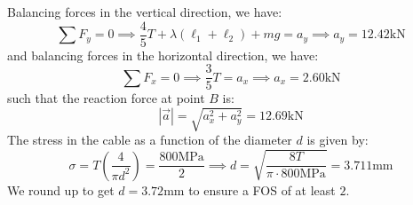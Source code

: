 \documentclass{article}
\begin{document}
Balancing forces in the vertical direction, we have:
\begin{equation}
    \sum F_y=0 \implies \frac{4}{5}T+\lambda(\ell_1+\ell_2)+mg=a_y \implies \boxed{a_y=12.42\si{\kilo\newton}}
    \label{eq:}
\end{equation}
and balancing forces in the horizontal direction, we have:
\begin{equation}
    \sum F_x=0 \implies \frac{3}{5}T=a_x \implies \boxed{a_x=2.60\si{\kilo\newton}}
    \label{eq:}
\end{equation}
such that the reaction force at point $B$ is:
\begin{equation}
    |\vec{a}|=\sqrt{a_x^2+a_y^2}=\boxed{12.69\si{\kilo\newton}}
    \label{eq:}
\end{equation}
The stress in the cable as a function of the diameter $d$ is given by:
\begin{equation}
    \sigma = T\left(\frac{4}{\pi d^2}\right) = \frac{800\si{\mega\pascal}}{2} \implies d = \sqrt{\frac{8T}{\pi \cdot 800\si{\mega\pascal}}} = 3.711\si{\milli\meter}
    \label{eq:}
\end{equation}
We round up to get $\boxed{d=3.72\si{\milli\meter}}$ to ensure a FOS of at least $2$.
\newpage
\end{document}

